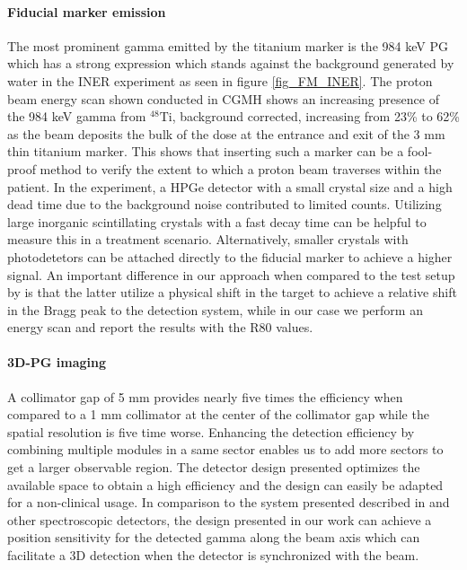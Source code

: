 \documentclass[11pt,a4paper]{article}
\begin{document}
\paragraph{Fiducial marker  emission}
The most prominent gamma emitted by the titanium marker is the 984 keV PG which has a strong expression which stands against the background generated by water in the INER experiment as seen in figure \ref{fig_FM_INER}. The proton beam energy scan shown conducted in CGMH shows an increasing presence of the 984 keV gamma from $\mathrm{^{48}Ti}$, background corrected, increasing from 23\% to 62\% as the beam deposits the bulk of the dose at the entrance and exit of the 3 mm thin titanium marker. This shows that inserting such a marker can be a fool-proof method to verify the extent to which a proton beam traverses within the patient. In the experiment, a HPGe detector with a small crystal size and a high dead time due to the background noise contributed to limited counts. Utilizing large inorganic scintillating crystals with a fast decay time can be helpful to measure this in a treatment scenario. Alternatively, smaller crystals with photodetetors can be attached directly to the fiducial marker to achieve a higher signal. 
An important difference in our approach when compared to the test setup by \cite{Bello2020} is that the latter utilize a physical shift in the target to achieve a relative shift in the Bragg peak to the detection system, while in our case we perform an energy scan and report the results with the R80 values. 

\paragraph{3D-PG imaging}
A collimator gap of 5 mm provides nearly five times the efficiency when compared to a 1 mm collimator at the center of the collimator gap while the spatial resolution is five time worse. Enhancing the detection efficiency by combining multiple modules in a same sector enables us to add more sectors to get a larger observable region. 
The detector design presented optimizes the available space to obtain a high efficiency  and the design can easily be adapted for a non-clinical usage. In comparison to the system presented described in \cite{Verburg2018} and other spectroscopic detectors, the design presented in our work can achieve a position sensitivity for the detected gamma along the beam axis which can facilitate a 3D detection when the detector is synchronized with the beam.
\end{document}
